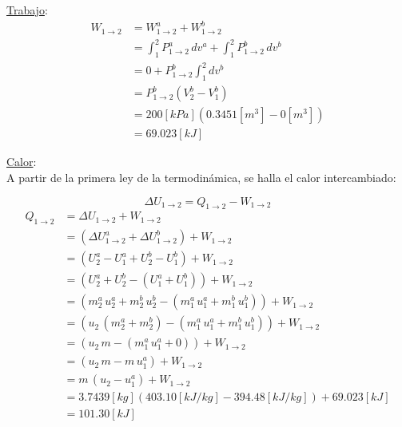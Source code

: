 \documentclass[letter,11pt]{article}
\begin{document}
\begin{enumerate}
\underline{Trabajo}: \\
\begin{equation*}
    \begin{split}
    W_{1\rightarrow 2} &= W_{1\rightarrow 2}^a + W_{1\rightarrow 2}^b \\
                       &= \int_1^2 P_{1\rightarrow 2}^a\,dv^a
                          + \int_1^2 P_{1\rightarrow 2}^b\,dv^b \\
                       &= 0 + P_{1\rightarrow 2}^b \int_1^2 dv^b \\
                       &= P_{1\rightarrow 2}^b (V_2^b - V_1^b) \\
                       &= 200[kPa](0.3451[m^3]-0[m^3]) \\
                       &= 69.023[kJ]
    \end{split}
\end{equation*}

\underline{Calor}: \\
A partir de la primera ley de la termodinámica, se halla el calor intercambiado:

\begin{equation*}
    \Delta U_{1\rightarrow 2} = Q_{1\rightarrow 2} - W_{1\rightarrow 2}
\end{equation*}
\begin{equation*}
    \begin{split}
        Q_{1\rightarrow 2} &= \Delta U_{1\rightarrow 2} + W_{1\rightarrow 2} \\
                           &= (\Delta U^a_{1\rightarrow 2} 
                              + \Delta U^b_{1\rightarrow 2})
                              + W_{1\rightarrow 2} \\
                           &= (U_2^a - U_1^a + U_2^b - U_1^b)
                              + W_{1\rightarrow 2} \\
                           &= (U_2^a+U_2^b - (U_1^a+U_1^b))
                              + W_{1\rightarrow 2} \\
                           &= (m_2^a\,u_2^a+m_2^b\,u_2^b
                              - (m_1^a\,u_1^a+m_1^b\,u_1^b))
                              + W_{1\rightarrow 2} \\
                           &= (u_2\,(m_2^a+m_2^b)
                              - (m_1^a\,u_1^a+m_1^b\,u_1^b))
                              + W_{1\rightarrow 2} \\
                           &= (u_2\,m-(m_1^a\,u_1^a+0))
                              + W_{1\rightarrow 2} \\
                           &= (u_2\,m-m\,u_1^a)+W_{1\rightarrow 2} \\
                           &= m\,(u_2-u_1^a)+W_{1\rightarrow 2} \\
                           &= 3.7439[kg](403.10[kJ/kg]
                              -394.48[kJ/kg])+69.023[kJ] \\
                           &= 101.30[kJ]
    \end{split}
\end{equation*}


\end{enumerate}
\end{document}
